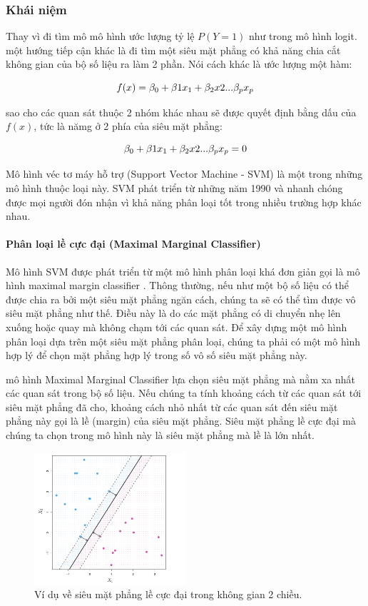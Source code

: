 \subsubsection{Khái niệm}
Thay vì đi tìm mô mô hình ước lượng tỷ lệ $P(Y =1)$ như trong mô hình logit. một hướng tiếp cận khác là đi tìm một siêu mặt phẳng có khả năng chia cắt không gian của bộ số liệu ra làm 2 phần. Nói cách khác là ước lượng một hàm:

$$
\large
f(x) = \beta_0 + \beta1 x_1 + \beta_2 x2 ...\beta_p x_p
$$

sao cho các quan sát thuộc 2 nhóm khác nhau sẽ được quyết định bằng dấu của $f(x)$, tức là nămg ở 2 phía của siêu mặt phẳng:

$$
\large
\beta_0 + \beta1 x_1 + \beta_2 x2 ...\beta_p x_p = 0
$$

Mô hình véc tơ máy hỗ trợ (Support Vector Machine - SVM) là một trong những mô hình thuộc loại này. SVM phát triển từ những năm 1990 và nhanh chóng được mọi người đón nhận vì khả năng phân loại tốt trong nhiều trường hợp khác nhau.

\paragraph{Phân loại lề cực đại (Maximal Marginal Classifier)}
Mô hình SVM được phát triển từ một mô hình phân loại khá đơn giản gọi là mô hình maximal margin classifier \parencite{boser1992training}. Thông thường, nếu như một bộ số liệu có thể được chia ra bởi một siêu mặt phẳng ngăn cách, chúng ta sẽ có thể tìm được vô siêu mặt phẳng như thế. Điều này là do các mặt phẳng có di chuyển nhẹ lên xuống hoặc quay mà không chạm tới các quan sát. Để xây dựng một mô hình phân loại dựa trên một siêu mặt phẳng phân loại,  chúng ta phải có một mô hình hợp lý để chọn mặt phẳng hợp lý trong số vô số siêu mặt phẳng này.

mô hình Maximal Marginal Classifier lựa chọn siêu mặt phẳng mà nằm xa nhất các quan sát trong bộ số liệu. Nếu chúng ta tính khoảng cách từ các quan sát tới siêu mặt phẳng đã cho, khoảng cách nhỏ nhất từ các quan sát đến siêu mặt phẳng này gọi là lề (margin) của siêu mặt phẳng. Siêu mặt phẳng lề cực đại mà chúng ta chọn trong mô hình này là siêu mặt phẳng mà lề là lớn nhất.

\begin{figure}
  \centering
   \includegraphics[width=0.5\textwidth]{./Figures/maxim_margin_example.png}
   \caption{Ví dụ về siêu mặt phẳng lề cực đại trong không gian 2 chiều.}
   \label{fig:maxim_margin_example}
\end{figure}

